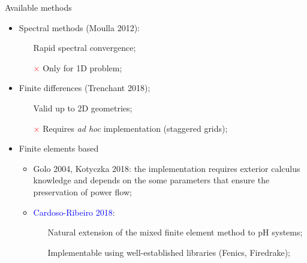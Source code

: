 \documentclass[aspectratio=169]{ISAE-Beamer}
\begin{document}
\begin{frame}{}
\begin{exampleblock}{Available methods}
	\begin{itemize}
		\item Spectral methods (Moulla 2012):
		\begin{itemize}
			\item[\textcolor{green}{\checkmark}] Rapid spectral convergence;
			\item[\textcolor{red}{$\times$}] Only for 1D problem;
		\end{itemize}
		\item Finite differences (Trenchant 2018);
		\begin{itemize}
			\item[\textcolor{green}{\checkmark}] Valid up to 2D geometries;
			\item[\textcolor{red}{$\times$}] Requires \textit{ad hoc} implementation (staggered grids);
		\end{itemize}
		\item Finite elements based
		\begin{itemize}
			\item Golo 2004, Kotyczka 2018: the implementation requires exterior calculus knowledge and depends on the some parameters that ensure the preservation of power flow;		
			\item \textcolor{blue}{Cardoso-Ribeiro 2018}:
			\begin{itemize}
				\item[\textcolor{green}{\checkmark}] Natural extension of the mixed finite element method to pH systems;
				\item[\textcolor{green}{\checkmark}] Implementable using well-established libraries (Fenics, Firedrake);
			\end{itemize}
		\end{itemize}
	\end{itemize}
\end{exampleblock}
\end{frame}
\end{document}
